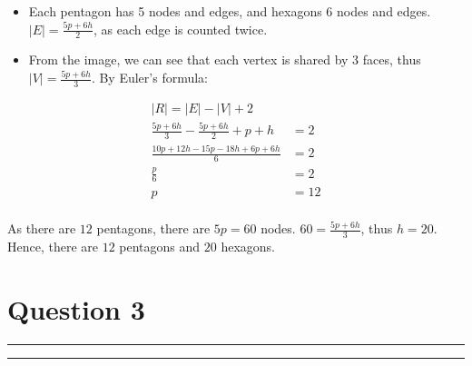 \documentclass{article}
\begin{document}
\begin{enumerate}[label=(\alph*)]
          \begin{itemize}
              \item  Each pentagon has 5 nodes and edges, and hexagons 6 nodes and edges. $|E| = \frac{5p + 6h}{2}$, as each edge is counted twice.
              \item From the image, we can see that each vertex is shared by 3 faces, thus $|V| = \frac{5p + 6h}{3}$. By Euler's formula:
          \end{itemize}
          \begin{align*}
              |R| = |E| - |V| + 2                                 \\
              \frac{5p + 6h}{3} - \frac{5p + 6h}{2} + p + h & = 2 \\
              \frac{10p + 12h - 15p - 18h + 6p + 6h}{6}     & = 2 \\
              \frac{p}{6}                                   & = 2 \\
              p                                             & =12 \\
          \end{align*}

          As there are $12$ pentagons, there are $5p = 60$ nodes. $60 = \frac{5p + 6h}{3}$, thus $h = 20$. Hence, there are $12$ pentagons and $20$ hexagons.
\end{enumerate}


\section*{Question 3}
\hrule\hrule
\vspace{0.5cm}
\end{document}

